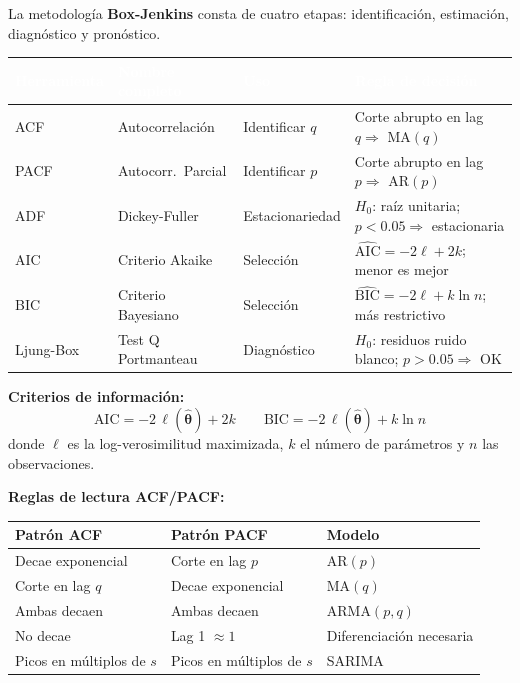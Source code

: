 \documentclass[12pt,letterpaper]{article}
\begin{document}
La metodología \textbf{Box-Jenkins} consta de cuatro etapas:
identificación, estimación, diagnóstico y pronóstico.

\vspace{4pt}
\begin{center}
\renewcommand{\arraystretch}{1.3}
\begin{tabular}{@{}L{1.5cm}L{2.4cm}L{2.0cm}L{4.0cm}@{}}
\toprule
{}\textcolor{white}{\textbf{Herramienta}} &
\textcolor{white}{\textbf{Nombre completo}} &
\textcolor{white}{\textbf{Uso}} &
\textcolor{white}{\textbf{Regla de decisión}} \\
\midrule
{} ACF  & Autocorrelación & Identificar $q$ & Corte abrupto en lag $q \Rightarrow$ MA$(q)$ \\
PACF & Autocorr.\ Parcial & Identificar $p$ & Corte abrupto en lag $p \Rightarrow$ AR$(p)$ \\
 ADF  & Dickey-Fuller & Estacionariedad & $H_0$: raíz unitaria; $p<0.05 \Rightarrow$ estacionaria \\
AIC  & Criterio Akaike & Selección & $\widehat{\text{AIC}}=-2\ell+2k$; menor es mejor \\
 BIC  & Criterio Bayesiano & Selección & $\widehat{\text{BIC}}=-2\ell+k\ln n$; más restrictivo \\
Ljung-Box & Test Q Portmanteau & Diagnóstico & $H_0$: residuos ruido blanco; $p>0.05 \Rightarrow$ OK \\
\bottomrule
\end{tabular}
\end{center}

\vspace{6pt}

\noindent\textbf{Criterios de información:}
\[
  \text{AIC} = -2\,\ell(\hat{\boldsymbol{\theta}}) + 2k \qquad
  \text{BIC} = -2\,\ell(\hat{\boldsymbol{\theta}}) + k\ln n
\]
donde $\ell$ es la log-verosimilitud maximizada, $k$ el número de parámetros y $n$ las observaciones.

\vspace{6pt}

\noindent\textbf{Reglas de lectura ACF/PACF:}

\begin{center}
\renewcommand{\arraystretch}{1.3}
\begin{tabular}{@{}L{3.5cm}L{3.5cm}L{3.0cm}@{}}
\toprule
\textbf{Patrón ACF} & \textbf{Patrón PACF} & \textbf{Modelo} \\
\midrule
{} Decae exponencial & Corte en lag $p$ & AR$(p)$ \\
Corte en lag $q$ & Decae exponencial & MA$(q)$ \\
 Ambas decaen & Ambas decaen & ARMA$(p,q)$ \\
No decae & Lag 1 $\approx 1$ & Diferenciación necesaria \\
 Picos en múltiplos de $s$ & Picos en múltiplos de $s$ & SARIMA \\
\bottomrule
\end{tabular}
\end{center}
\end{document}
